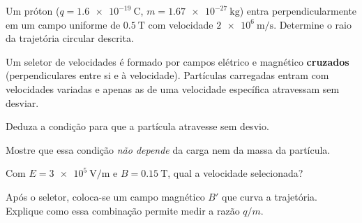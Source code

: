 \blocoaprofundamento
\begin{questao}[3]{}

Um próton ($q = \SI{1.6e-19}{\coulomb}$, $m = \SI{1.67e-27}{\kilogram}$) entra
perpendicularmente em um campo uniforme de $\SI{0.5}{\tesla}$ com velocidade
$\SI{2e6}{\meter\per\second}$. Determine o raio da trajetória circular descrita.


\end{questao}
\begin{questao}[3]{}

Um seletor de velocidades é formado por campos elétrico e magnético
\textbf{cruzados} (perpendiculares entre si e à velocidade). Partículas
carregadas entram com velocidades variadas e apenas as de uma velocidade
específica atravessam sem desviar.


\begin{itensq}
\item Deduza a condição para que a partícula atravesse sem desvio.
\item Mostre que essa condição \emph{não depende} da carga nem da massa da
      partícula.
\item Com $E = \SI{3e5}{\volt\per\meter}$ e $B = \SI{0.15}{\tesla}$, qual a
      velocidade selecionada?
\item Após o seletor, coloca-se um campo magnético $B'$ que curva a trajetória.
      Explique como essa combinação permite medir a razão $q/m$.
\end{itensq}


\end{questao}

